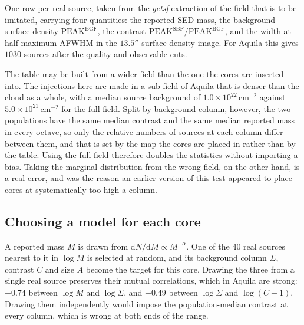 \documentclass[11pt,a4paper]{article}
\begin{document}
One row per real source, taken from the \emph{getsf} extraction of the field
that is to be imitated, carrying four quantities: the reported SED mass, the
background surface density $\mathrm{PEAK^{BGF}}$, the contrast
$\mathrm{PEAK^{SBF}}/\mathrm{PEAK^{BGF}}$, and the width at half maximum
AFWHM in the $13.5''$ surface-density image. For Aquila this gives $1030$
sources after the quality and observable cuts.

The table may be built from a wider field than the one the cores are inserted
into. The injections here are made in a sub-field of Aquila that is denser
than the cloud as a whole, with a median source background of
$1.0\times10^{22}\,\mathrm{cm^{-2}}$ against $5.0\times10^{21}\,
\mathrm{cm^{-2}}$ for the full field. Split by background column, however, the
two populations have the same median contrast and the same median reported
mass in every octave, so only the relative numbers of sources at each column
differ between them, and that is set by the map the cores are placed in rather
than by the table. Using the full field therefore doubles the statistics
without importing a bias. Taking the marginal distribution from the wrong
field, on the other hand, is a real error, and was the reason an earlier
version of this test appeared to place cores at systematically too high a
column.

\subsection{Choosing a model for each core}

A reported mass $M$ is drawn from $\mathrm{d}N/\mathrm{d}M \propto
M^{-\alpha}$. One of the $40$ real sources nearest to it in $\log M$ is
selected at random, and its background column $\Sigma$, contrast $C$ and size
$A$ become the target for this core. Drawing the three from a single real
source preserves their mutual correlations, which in Aquila are strong: $+0.74$
between $\log M$ and $\log\Sigma$, and $+0.49$ between $\log\Sigma$ and
$\log(C-1)$. Drawing them independently would impose the population-median
contrast at every column, which is wrong at both ends of the range.
\end{document}
